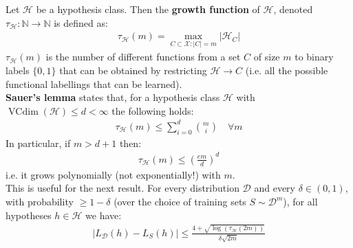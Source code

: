 \documentclass[../template.tex]{subfiles}
\begin{document}
Let $\mathcal{H}$ be a hypothesis class. Then the \textbf{growth function} of $\mathcal{H}$, denoted $\tau_{\mathcal{H}} \colon \mathbb{N} \to \mathbb{N}$ is defined as:
\begin{align*}
    \tau_{\mathcal{H}}(m) = \max_{C \subset \mathcal{X}\colon |C| = m} |\mathcal{H}_C|
\end{align*}    
$\tau_{\mathcal{H}}(m)$ is the number of different functions from a set $C$ of size $m$ to binary labels $\{0,1\}$ that can be obtained by restricting $\mathcal{H} \to C$ (i.e. all the possible functional labellings that can be learned).\\
\textbf{Sauer's lemma} states that, for a hypothesis class $\mathcal{H}$ with $\operatorname{VCdim}(\mathcal{H}) \leq d < \infty$ the following holds:
\begin{align*}
    \tau_{\mathcal{H}} (m) \leq \sum_{i=0}^d {m \choose i} \quad \forall m
\end{align*} 
In particular, if $ m > d +1 $ then:
\begin{align*}
    \tau_{\mathcal{H}}(m) \leq \left(\frac{e m }{d} \right)^d
\end{align*}  
i.e. it grows polynomially (not exponentially!) with $m$.\\

This is useful for the next result. For every distribution $\mathcal{D}$ and every $\delta \in (0,1)$, with probability $\geq 1-\delta$ (over the choice of training sets $S \sim \mathcal{D}^m$), for all hypotheses $h \in \mathcal{H}$ we have:
\begin{align*}
    |L_{\mathcal{D}}(h) - L_S(h)| \leq \frac{4 + \sqrt{\log(\tau_{\mathcal{H}}(2m))}}{\delta \sqrt{2m}} 
\end{align*}     


    
\end{document}
